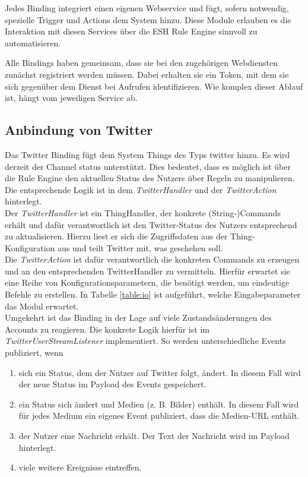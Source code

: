 Jedes Binding integriert einen eigenen Webservice und fügt, sofern notwendig, spezielle Trigger und Actions dem System hinzu. Diese Module erlauben es die Interaktion mit diesen Services über die ESH Rule Engine sinnvoll zu automatisieren.

Alle Bindings haben gemeinsam, dass sie bei den zugehörigen Webdiensten zunächst registriert werden müssen. Dabei erhalten sie ein Token, mit dem sie sich gegenüber dem Dienst bei Aufrufen identifizieren. Wie komplex dieser Ablauf ist, hängt vom jeweiligen Service ab.

\subsection{Anbindung von Twitter}
Das Twitter Binding fügt dem System Things des Typs \glqq twitter\grqq{} hinzu. Es wird derzeit der Channel \glqq status\grqq{} unterstützt. Dies bedeutet, dass es möglich ist über die Rule Engine den aktuellen Status des Nutzers über Regeln zu manipulieren. Die entsprechende Logik ist in dem \textit{TwitterHandler} und der \textit{TwitterAction} hinterlegt. \\

Der \textit{TwitterHandler} ist ein ThingHandler, der konkrete (String-)Commands erhält und dafür verantwortlich ist den Twitter-Status des Nutzers entsprechend zu aktualisieren.  Hierzu liest er sich die Zugriffsdaten aus der Thing-Konfiguration aus und teilt Twitter mit, was geschehen soll.\\

Die \textit{TwitterAction} ist dafür verantwortlich die konkreten Commands zu erzeugen und an den entsprechenden TwitterHandler zu vermitteln. Hierfür erwartet sie eine Reihe von Konfigurationsparametern, die benötigt werden, um eindeutige Befehle zu erstellen. In Tabelle \ref{table:io} ist aufgeführt, welche Eingabeparameter das Modul erwartet.\\

Umgekehrt ist das Binding in der Lage auf viele Zustandsänderungen des Accounts zu reagieren. Die konkrete Logik hierfür ist im \textit{TwitterUserStreamListener} implementiert. So werden unterschiedliche Events publiziert, wenn

\begin{enumerate}
\item sich ein Status, dem der Nutzer auf Twitter folgt, ändert. In diesem Fall wird der neue Status im Payload des Events gespeichert.
\item ein Status sich ändert und Medien (z. B. Bilder) enthält. In diesem Fall wird für jedes Medium ein eigenes Event publiziert, dass die Medien-URL enthält.
\item der Nutzer eine Nachricht erhält. Der Text der Nachricht wird im Payload hinterlegt.
\item viele weitere Ereignisse eintreffen.
\end{enumerate}
 
